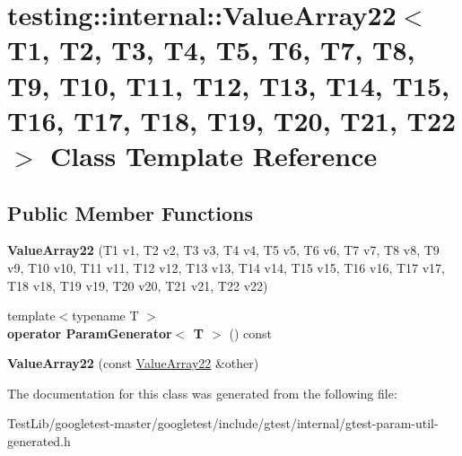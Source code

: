 \hypertarget{classtesting_1_1internal_1_1ValueArray22}{}\section{testing\+:\+:internal\+:\+:Value\+Array22$<$ T1, T2, T3, T4, T5, T6, T7, T8, T9, T10, T11, T12, T13, T14, T15, T16, T17, T18, T19, T20, T21, T22 $>$ Class Template Reference}
\label{classtesting_1_1internal_1_1ValueArray22}
\subsection*{Public Member Functions}
\begin{DoxyCompactItemize}
\item 
\mbox{\label{classtesting_1_1internal_1_1ValueArray22_a65c51cba30994847b9e904edb41dee0e}} 
{\bfseries Value\+Array22} (T1 v1, T2 v2, T3 v3, T4 v4, T5 v5, T6 v6, T7 v7, T8 v8, T9 v9, T10 v10, T11 v11, T12 v12, T13 v13, T14 v14, T15 v15, T16 v16, T17 v17, T18 v18, T19 v19, T20 v20, T21 v21, T22 v22)
\item 
\mbox{\label{classtesting_1_1internal_1_1ValueArray22_aed2e5437d46e87d6de846be6f27ea936}} 
{\footnotesize template$<$typename T $>$ }\\{\bfseries operator Param\+Generator$<$ T $>$} () const
\item 
\mbox{\label{classtesting_1_1internal_1_1ValueArray22_aa1224f9cebb6f87d7ad78ed90b42e77e}} 
{\bfseries Value\+Array22} (const \hyperlink{classtesting_1_1internal_1_1ValueArray22}{Value\+Array22} \&other)
\end{DoxyCompactItemize}


The documentation for this class was generated from the following file\+:\begin{DoxyCompactItemize}
\item 
Test\+Lib/googletest-\/master/googletest/include/gtest/internal/gtest-\/param-\/util-\/generated.\+h\end{DoxyCompactItemize}
